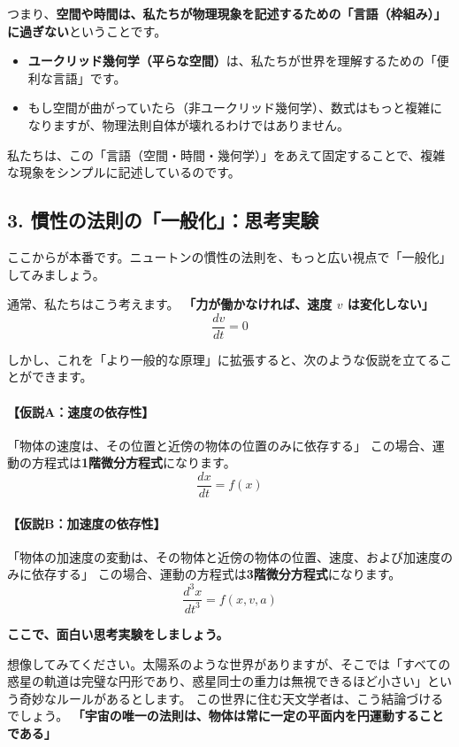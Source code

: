 \documentclass[a4paper,11pt,openany]{ltjsbook}
\begin{document}
\begin{lecturebox}
つまり、\textbf{空間や時間は、私たちが物理現象を記述するための「言語（枠組み）」に過ぎない}ということです。

\begin{itemize}[leftmargin=2em]
\item \textbf{ユークリッド幾何学（平らな空間）}は、私たちが世界を理解するための「便利な言語」です。
\item もし空間が曲がっていたら（非ユークリッド幾何学）、数式はもっと複雑になりますが、物理法則自体が壊れるわけではありません。
\end{itemize}

私たちは、この「言語（空間・時間・幾何学）」をあえて固定することで、複雑な現象をシンプルに記述しているのです。

\subsection*{3. 慣性の法則の「一般化」：思考実験}

ここからが本番です。ニュートンの慣性の法則を、もっと広い視点で「一般化」してみましょう。

通常、私たちはこう考えます。
\textbf{「力が働かなければ、速度 $v$ は変化しない」}
$$\frac{dv}{dt} = 0$$

しかし、これを「より一般的な原理」に拡張すると、次のような仮説を立てることができます。

\paragraph{【仮説A：速度の依存性】}
「物体の速度は、その位置と近傍の物体の位置のみに依存する」
この場合、運動の方程式は\textbf{1階微分方程式}になります。
$$\frac{dx}{dt} = f(x)$$

\paragraph{【仮説B：加速度の依存性】}
「物体の加速度の変動は、その物体と近傍の物体の位置、速度、および加速度のみに依存する」
この場合、運動の方程式は\textbf{3階微分方程式}になります。
$$\frac{d^3x}{dt^3} = f(x, v, a)$$

\textbf{ここで、面白い思考実験をしましょう。}

想像してみてください。太陽系のような世界がありますが、そこでは「すべての惑星の軌道は完璧な円形であり、惑星同士の重力は無視できるほど小さい」という奇妙なルールがあるとします。
この世界に住む天文学者は、こう結論づけるでしょう。
\textbf{「宇宙の唯一の法則は、物体は常に一定の平面内を円運動することである」}


\end{lecturebox}
\end{document}
